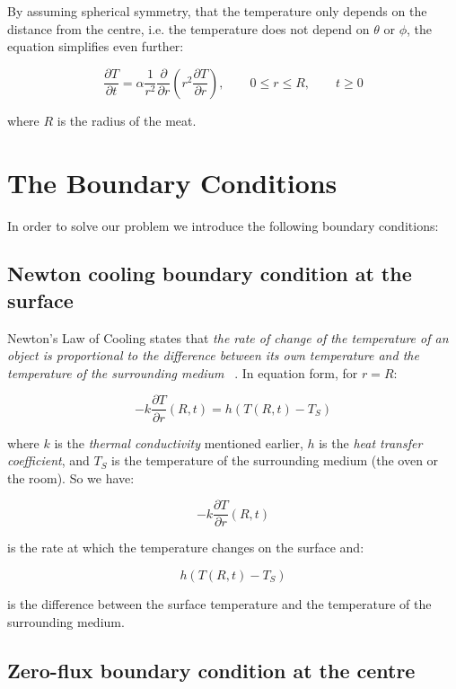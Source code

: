 \documentclass{report}
\begin{document}
By assuming spherical symmetry, that the temperature only depends on the distance from the centre, i.e. the 
temperature does not depend on $\theta$ or $\phi$, the equation simplifies even further:\bigskip

\[ 
\frac{\partial T}{\partial t} = \alpha \frac{1}{r^2} \frac{\partial}{\partial r} \left( r^2 \frac{\partial T}{\partial r} \right), \qquad 0 \leq r \leq R, \qquad  t \geq 0 
\]\medskip

where $R$ is the radius of the meat.




\section{The Boundary Conditions}

In order to solve our problem we introduce the following boundary conditions:


\subsection{Newton cooling boundary condition at the surface}

Newton's Law of Cooling states that \emph{the rate of change of the temperature of an object is proportional 
to the difference between its own temperature and the temperature of the surrounding medium} ~\cite{wiki:nlc}. 
In equation form, for  $r = R$:\bigskip

\[ -k \frac{\partial T}{\partial r}(R, t) = h (T(R, t) - T_S) \]\medskip

where $k$ is the \emph{thermal conductivity} mentioned earlier, $h$ is the \emph{heat transfer 
coefficient}, and $T_S$ is the temperature of the surrounding medium (the oven or the room). 
So we have:\bigskip

\[ -k \frac{\partial T}{\partial r}(R, t) \]\medskip

is the rate at which the temperature changes on the surface and:\bigskip

\[ h (T(R, t) - T_S) \]\medskip

is the difference between the surface temperature and the temperature of the surrounding medium.



\subsection{Zero-flux boundary condition at the centre}
\end{document}
